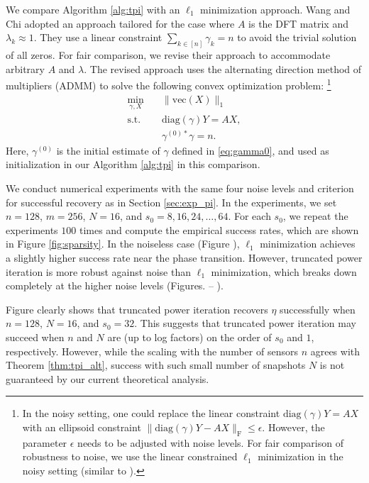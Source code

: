 \documentclass[11pt,journal]{IEEEtran}
\newcommand{\rmF}{\mathrm{F}}
\newcommand{\norm}[1]{\|{#1}\|}
\newcommand{\vect}{\mathrm{vec}}
\newcommand{\diag}{\mathrm{diag}}
\begin{document}
We compare Algorithm \ref{alg:tpi} with an $\ell_1$ minimization approach. Wang and Chi \cite{Wang2016} adopted an approach tailored for the case where $A$ is the DFT matrix and $\lambda_k \approx 1$. They use a linear constraint $\sum_{k\in[n]}\gamma_k = n$ to avoid the trivial solution of all zeros. For fair comparison, we revise their approach to accommodate arbitrary $A$ and $\lambda$. The revised approach uses the alternating direction method of multipliers (ADMM) \cite{Boyd2010} to solve the following convex optimization problem: \footnote{In the noisy setting, one could replace the linear constraint $\diag(\gamma) Y = AX$ with an ellipsoid constraint $\norm{\diag(\gamma) Y - AX}_\rmF \leq \epsilon$. However, the parameter $\epsilon$ needs to be adjusted with noise levels. For fair comparison of robustness to noise, we use the linear constrained $\ell_1$ minimization in the noisy setting (similar to \cite{Wang2016}).}
\begin{align*}
\min_{\gamma,X} \quad & \norm{\vect(X)}_1 \\
\text{s.t.} \quad & \diag(\gamma) Y = AX, \\
& \gamma^{(0)*} \gamma = n.
\end{align*}
Here, $\gamma^{(0)}$ is the initial estimate of $\gamma$ defined in \eqref{eq:gamma0}, and used as initialization in our Algorithm \ref{alg:tpi} in this comparison.

We conduct numerical experiments with the same four noise levels and criterion for successful recovery as in Section \ref{sec:exp_pi}. In the experiments, we set $n=128$, $m=256$, $N=16$, and $s_0 = 8, 16, 24, \dots, 64$. For each $s_0$, we repeat the experiments $100$ times and compute the empirical success rates, which are shown in Figure \ref{fig:sparsity}. In the noiseless case (Figure ), $\ell_1$ minimization achieves a slightly higher success rate near the phase transition. However, truncated power iteration is more robust against noise than $\ell_1$ minimization, which breaks down completely at the higher noise levels (Figures.  -- ).

Figure  clearly shows that truncated power iteration recovers $\eta$ successfully when $n=128$, $N=16$, and $s_0 = 32$. This suggests that truncated power iteration may succeed when $n$ and $N$ are (up to log factors) on the order of $s_0$ and $1$, respectively. However, while the scaling with the number of sensors $n$ agrees with Theorem \ref{thm:tpi_alt}, success with such small number of snapshots $N$ is not guaranteed by our current theoretical analysis. 
\end{document}
